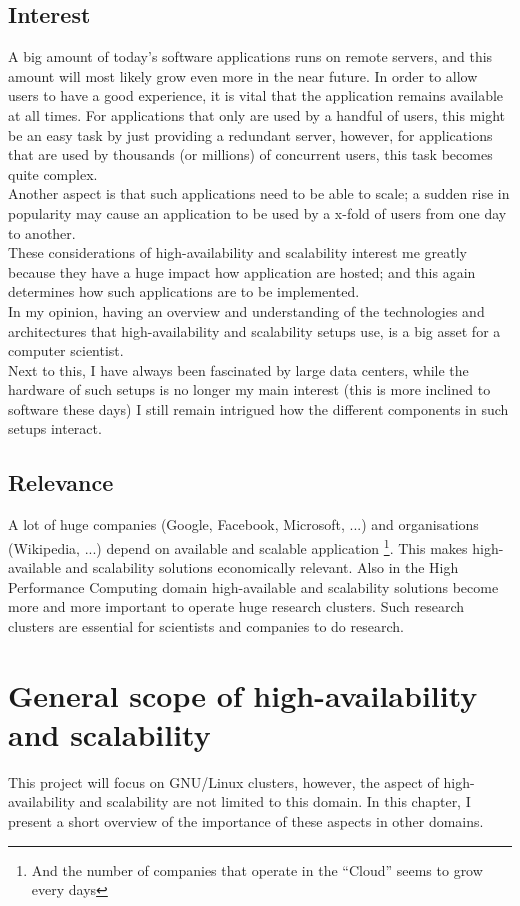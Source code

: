 \documentclass[12pt]{report}
\begin{document}
\section{Interest}
A big amount of today's software applications runs on remote servers, and
this amount will most likely grow even more in the near future. In
order to allow users to have a good experience, it is vital that the
application remains available at all times. For applications that only are
used by a handful of users, this might be an easy task by just
providing a redundant server, however, for applications that are used
by thousands (or millions) of concurrent users, this task becomes
quite complex.\\
Another aspect is that such applications need to be able to scale; a
sudden rise in popularity may cause an application to be used by a
x-fold of users from one day to another.\\
These considerations of high-availability and scalability interest me
greatly because they have a huge impact how application are
hosted; and this again determines how such applications are to be
implemented.\\
In my opinion, having an overview and understanding of the technologies and
architectures that high-availability and scalability setups use,
is a big asset for a computer scientist.\\
Next to this, I have always been fascinated by large data centers,
while the hardware of such setups is no longer my main interest (this
is more inclined to software these days) I still remain intrigued how
the different components in such setups interact.

\section{Relevance}
A lot of huge companies (Google, Facebook, Microsoft, ...) and
organisations (Wikipedia, ...) depend on available and scalable
application \footnote{And the number of companies that operate in the
  ``Cloud'' seems to grow every days}. This makes
high-available and scalability solutions economically relevant.
Also in the High Performance Computing domain high-available and
scalability solutions become more and more important to operate huge
research clusters. Such research clusters are essential for scientists
and companies to do research.

\chapter{General scope of high-availability and scalability}
This project will focus on GNU/Linux clusters, however,
the aspect of high-availability and scalability are not limited to
this domain. In this chapter, I present a short overview of the
importance of these aspects in other domains.
\end{document}
